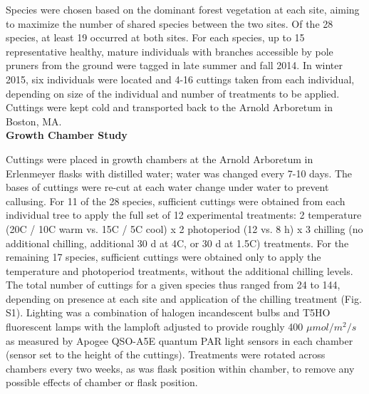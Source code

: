 \documentclass[11pt]{article}
\begin{document}
Species were chosen based on the dominant forest vegetation at each site, aiming to maximize the number of shared species between the two sites. Of the 28 species, at least 19 occurred at both sites. For each species, up to 15 representative healthy, mature individuals with branches accessible by pole pruners from the ground were tagged in late summer and fall 2014. In winter 2015, six individuals were located and 4-16 cuttings taken from each individual, depending on size of the individual and number of treatments to be applied. Cuttings were kept cold and transported back to the Arnold Arboretum in Boston, MA.
\vspace{1ex}\\
\noindent \textbf{Growth Chamber Study}

\noindent Cuttings were placed in growth chambers at the Arnold Arboretum in Erlenmeyer flasks with distilled water; water was changed every 7-10 days. The bases of cuttings were re-cut at each water change under water to prevent callusing. For 11 of the 28 species, sufficient cuttings were obtained from each individual tree to apply the full set of 12 experimental treatments: 2 temperature (20\degree C / 10\degree C warm vs. 15\degree C / 5\degree C cool) x 2 photoperiod (12 vs. 8 h) x 3 chilling (no additional chilling, additional 30 d at 4\degree C, or 30 d at 1.5\degree C) treatments. For the remaining 17 species, sufficient cuttings were obtained only to apply the temperature and photoperiod treatments, without the additional chilling levels. The total number of cuttings for a given species thus ranged from 24 to 144, depending on presence at each site and application of the chilling treatment (Fig. S1). Lighting was a combination of halogen incandescent bulbs and T5HO fluorescent lamps with the lamploft adjusted to provide roughly 400 $\mu mol/m^{2}/s$ as measured by Apogee QSO-A5E quantum PAR light sensors in each chamber (sensor set to the height of the cuttings). Treatments were rotated across chambers every two weeks, as was flask position within chamber, to remove any possible effects of chamber or flask position. 
\end{document}
